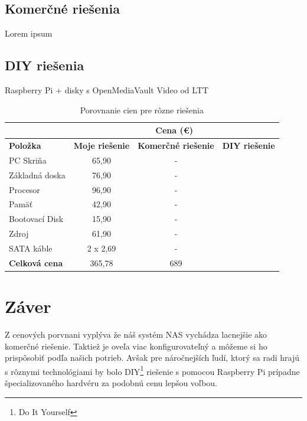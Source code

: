 \documentclass[12pt,oneside,slovak,a4paper]{article}
\begin{document}
\subsection{Komerčné riešenia}
Lorem ipsum

\subsection{DIY riešenia}
Raspberry Pi + disky s OpenMediaVault
Video od LTT



\begin{table}[h]
\centering
\begin{tabular}{|l|c|c|c|}
\hline & \multicolumn{3}{c|}{\textbf{Cena (€)}} \\ \hline
\textbf{Položka} & \textbf{Moje riešenie} & \textbf{Komerčné riešenie} & \textbf{DIY riešenie} \\ \hline
PC Skriňa & 65,90 & - &  \\ \hline
Základná doska & 76,90 & - &  \\ \hline
Procesor & 96,90 & - &  \\ \hline
Pamäť & 42,90 & - &  \\ \hline
Bootovací Disk & 15,90 & - &  \\ \hline
Zdroj & 61,90 & - &  \\ \hline
SATA káble & 2 x 2,69 & - &  \\ \hline
\textbf{Celková cena} & 365,78 & 689 &  \\ \hline
\end{tabular}
\caption{Porovnanie cien pre rôzne riešenia}
\end{table}


\section{Záver}
Z cenových porvnani vyplýva že náš systém NAS vychádza lacnejšie ako komerčné riešenie. Taktiež je oveľa viac konfigurovateľný a môžeme si ho prispôsobiť podľa našich potrieb. Avšak pre náročnejších ľudí, ktorý sa radi hrajú s rôznymi technológiami by bolo DIY\footnote{Do It Yourself} riešenie s pomocou Raspberry Pi prípadne špecializovaného hardvéru za podobnú cenu lepšou voľbou.




\end{document}
